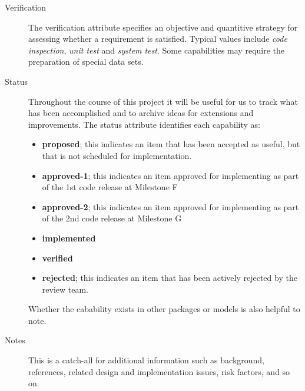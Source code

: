 \begin{description}
\item [Verification] The verification attribute specifies an objective
and quantitive strategy for assessing whether a requirement is
satisfied.  Typical values include {\it code inspection}, 
{\it unit test} and {\it system test}.
Some capabilities may require the preparation of special data sets.

\item [Status] Throughout the course of this project it will be 
useful for us to track what has been accomplished and to archive 
ideas for extensions and improvements.  The status attribute identifies
each capability as:
\begin{itemize}
\item {\bf proposed}; this indicates an item that has been accepted as useful, but
that is not scheduled for implementation.
\item {\bf approved-1}; this indicates an item approved for implementing as part
of the 1st code release at Milestone F
\item {\bf approved-2}; this indicates an item approved for implementing as part 
of the 2nd code release at Milestone G
\item {\bf implemented}
\item {\bf verified}
\item {\bf rejected}; this indicates an item that has been actively rejected by
the review team.
\end{itemize}
Whether the cabability exists in other packages or models
is also helpful to note.

\item [Notes] This is a catch-all for additional information such
as background, references, related design and implementation issues, 
risk factors, and so on.

\end{description}


